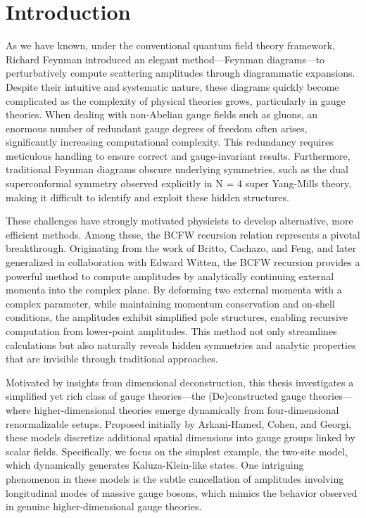 \documentclass[12pt]{article}
\numberwithin{equation}{section}
\begin{document}
\section{Introduction}
As we have known, under the conventional quantum field theory framework, Richard Feynman introduced an elegant method—Feynman diagrams—to perturbatively compute scattering amplitudes through diagrammatic expansions. Despite their intuitive and systematic nature, these diagrams quickly become complicated as the complexity of physical theories grows, particularly in gauge theories. When dealing with non-Abelian gauge fields such as gluons, an enormous number of redundant gauge degrees of freedom often arises, significantly increasing computational complexity. This redundancy requires meticulous handling to ensure correct and gauge-invariant results. Furthermore, traditional Feynman diagrams obscure underlying symmetries, such as the dual superconformal symmetry observed explicitly in N = 4 super Yang-Mills theory, making it difficult to identify and exploit these hidden structures.

These challenges have strongly motivated physicists to develop alternative, more efficient methods. Among these, the BCFW recursion relation represents a pivotal breakthrough. Originating from the work of Britto, Cachazo, and Feng, and later generalized in collaboration with Edward Witten, the BCFW recursion provides a powerful method to compute amplitudes by analytically continuing external momenta into the complex plane. By deforming two external momenta with a complex parameter, while maintaining momentum conservation and on-shell conditions, the amplitudes exhibit simplified pole structures, enabling recursive computation from lower-point amplitudes. This method not only streamlines calculations but also naturally reveals hidden symmetries and analytic properties that are invisible through traditional approaches.

Motivated by insights from dimensional deconstruction, this thesis investigates a simplified yet rich class of gauge theories—the (De)constructed gauge theories—where higher-dimensional theories emerge dynamically from four-dimensional renormalizable setups. Proposed initially by Arkani-Hamed, Cohen, and Georgi, these models discretize additional spatial dimensions into gauge groups linked by scalar fields. Specifically, we focus on the simplest example, the two-site model, which dynamically generates Kaluza-Klein-like states. One intriguing phenomenon in these models is the subtle cancellation of amplitudes involving longitudinal modes of massive gauge bosons, which mimics the behavior observed in genuine higher-dimensional gauge theories.
\end{document}
